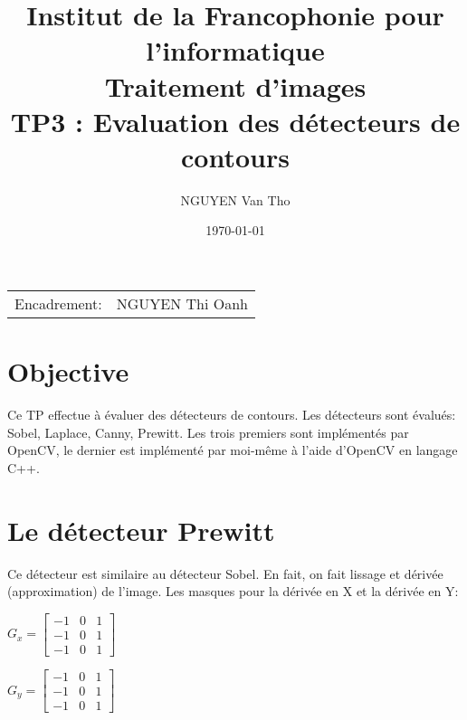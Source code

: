 \documentclass[article=a4, fontsize=11pt]{scrartcl}	%
\title{ \Large {Institut de la Francophonie pour l'informatique \\ \Huge Traitement d'images}\\ \Large TP3 : Evaluation des détecteurs de contours} %
\author{\textsc{NGUYEN} Van Tho} %
\date{\today} %
\begin{document}
\maketitle %

\begin{center}
\begin{tabular}{l r}
Encadrement: & NGUYEN Thi Oanh %
\end{tabular}
\end{center}



\section{Objective}

Ce TP effectue à évaluer des détecteurs de contours. Les détecteurs sont évalués: Sobel, Laplace, Canny, Prewitt. Les trois premiers sont implémentés par OpenCV, le dernier est implémenté par moi-même à l'aide d'OpenCV en langage C++.

\section{Le détecteur Prewitt}
Ce détecteur est similaire au détecteur Sobel. En fait, on fait lissage et dérivée (approximation) de l'image. Les masques pour la dérivée en X et la dérivée en Y:
\begin{center}
 $G_{x} =	\begin{bmatrix} 
	  -1     & 0 & 1\\ 
	  -1     & 0 & 1\\
	  -1     & 0 & 1
	\end{bmatrix}$
\end{center}
\begin{center}
 $G_{y} =	\begin{bmatrix} 
	  -1     & 0 & 1\\ 
	  -1     & 0 & 1\\
	  -1     & 0 & 1
	\end{bmatrix}$
\end{center}
\end{document}
